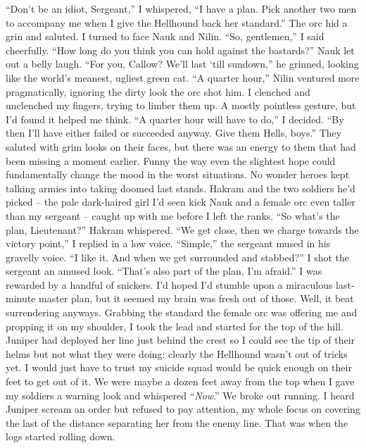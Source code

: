 \documentclass[12pt, openany]{book}
\begin{document}
“Don’t be an idiot, Sergeant,” I whispered, “I have a plan. Pick another two men to accompany me when I give the Hellhound back her standard.”
The orc hid a grin and saluted. I turned to face Nauk and Nilin.
“So, gentlemen,” I said cheerfully. “How long do you think you can hold against the bastards?”
Nauk let out a belly laugh.
“For you, Callow? We’ll last ‘till sundown,” he grinned, looking like the world’s meanest, ugliest green cat.
“A quarter hour,” Nilin ventured more pragmatically, ignoring the dirty look the orc shot him.
I clenched and unclenched my fingers, trying to limber them up. A mostly pointless gesture, but I’d found it helped me think.
“A quarter hour will have to do,” I decided. “By then I’ll have either failed or succeeded anyway. Give them Hells, boys.”
They saluted with grim looks on their faces, but there was an energy to them that had been missing a moment earlier. Funny the way even the slightest hope could fundamentally change the mood in the worst situations. No wonder heroes kept talking armies into taking doomed last stands. Hakram and the two soldiers he’d picked – the pale dark-haired girl I’d seen kick Nauk and a female orc even taller than my sergeant – caught up with me before I left the ranks.
“So what’s the plan, Lieutenant?” Hakram whispered.
“We get close, then we charge towards the victory point,” I replied in a low voice.
“Simple,” the sergeant mused in his gravelly voice. “I like it. And when we get surrounded and stabbed?”
I shot the sergeant an amused look.
“That’s also part of the plan, I’m afraid.”
I was rewarded by a handful of snickers. I’d hoped I’d stumble upon a miraculous last-minute master plan, but it seemed my brain was fresh out of those. Well, it beat surrendering anyways. Grabbing the standard the female orc was offering me and propping it on my shoulder, I took the lead and started for the top of the hill. Juniper had deployed her line just behind the crest so I could see the tip of their helms but not what they were doing: clearly the Hellhound wasn’t out of tricks yet. I would just have to trust my suicide squad would be quick enough on their feet to get out of it. We were maybe a dozen feet away from the top when I gave my soldiers a warning look and whispered “\textit{Now}.” We broke out running. I heard Juniper scream an order but refused to pay attention, my whole focus on covering the last of the distance separating her from the enemy line.
That was when the logs started rolling down.
\end{document}
